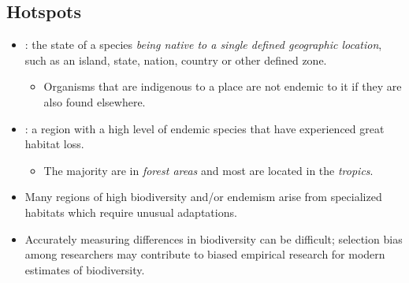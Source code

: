 \documentclass{inVerba-notes}
\begin{document}
\begin{itemize}
    \subsection{Hotspots}\label{Hotspots}
    \begin{itemize}
        \item {}: the state of a species \emph{being native to a single defined geographic location}, such as an island, state, nation, country or other defined zone.
            \begin{itemize}
                \item Organisms that are indigenous to a place are not endemic to it if they are also found elsewhere.
            \end{itemize}
        \item {}: a region with a high level of endemic species that have experienced great habitat loss.
            \begin{itemize}
                \item The majority are in \emph{forest areas} and most are located in the \emph{tropics}.
            \end{itemize}
        \item Many regions of high biodiversity and/or endemism arise from specialized habitats which require unusual adaptations.
        \item Accurately measuring differences in biodiversity can be difficult; selection bias among researchers may contribute to biased empirical research for modern estimates of biodiversity. 
    \end{itemize}
\end{itemize}

\clearpage
\end{document}
